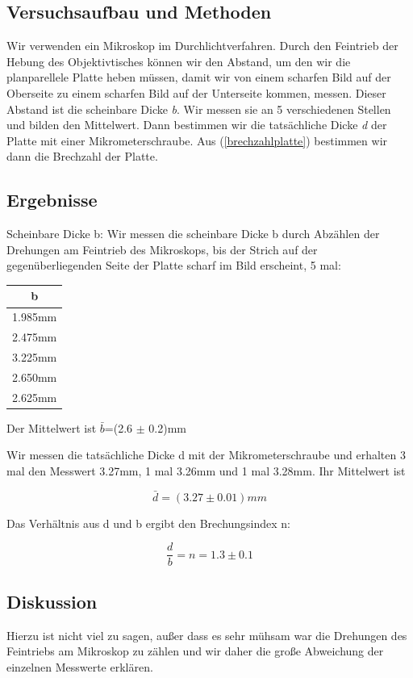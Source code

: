 \documentclass{article}
\begin{document}
\subsection{Versuchsaufbau und Methoden}
Wir verwenden ein Mikroskop im Durchlichtverfahren. Durch den Feintrieb der Hebung des Objektivtisches können wir den Abstand, um den wir die planparellele Platte heben müssen, damit wir von einem scharfen Bild auf der Oberseite zu einem scharfen Bild auf der Unterseite kommen, messen. Dieser Abstand ist die scheinbare Dicke \textit{b}. Wir messen sie an 5 verschiedenen Stellen und bilden den Mittelwert. Dann bestimmen wir die tatsächliche Dicke \textit{d} der Platte mit einer Mikrometerschraube. Aus (\ref{brechzahlplatte}) bestimmen wir dann die Brechzahl der Platte.
\subsection{Ergebnisse}
Scheinbare Dicke b:
Wir messen die scheinbare Dicke b durch Abzählen der Drehungen am Feintrieb des Mikroskops, bis der Strich auf der gegenüberliegenden Seite der Platte scharf im Bild erscheint, 5 mal:\\
\begin{center}


\begin{tabular}{|c|}

b\\
\hline
1.985mm\\
2.475mm\\
3.225mm\\
2.650mm\\
2.625mm\\
\end{tabular}
Der Mittelwert ist $\bar{b}$=(2.6 $\pm$ 0.2)mm
\end{center}

Wir messen die tatsächliche Dicke d mit der Mikrometerschraube und erhalten 3 mal den Messwert 3.27mm, 1 mal 3.26mm und 1 mal 3.28mm. Ihr Mittelwert ist

$$\bar{d}=(3.27 \pm 0.01) mm$$

Das Verhältnis aus d und b ergibt den Brechungsindex n:

$$\frac{d}{b}=n=1.3 \pm 0.1$$

\subsection{Diskussion}
Hierzu ist nicht viel zu sagen, außer dass es sehr mühsam war die Drehungen des Feintriebs am Mikroskop zu zählen und wir daher die große Abweichung der einzelnen Messwerte erklären.
\end{document}
